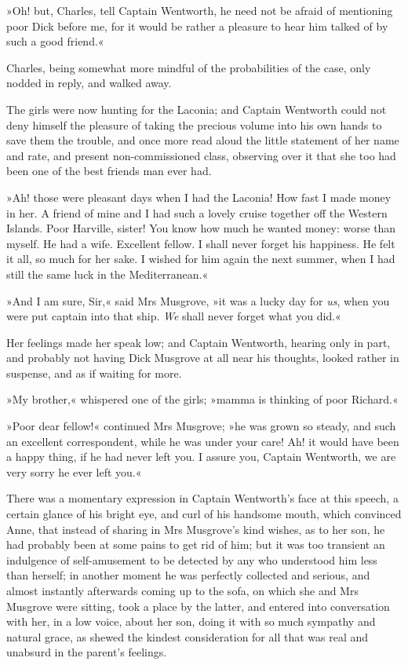 »Oh! but, Charles, tell Captain Wentworth, he need not be afraid of mentioning poor Dick before me, for it would be rather a pleasure to hear him talked of by such a good friend.«

Charles, being somewhat more mindful of the probabilities of the case, only nodded in reply, and walked away.

The girls were now hunting for the Laconia; and Captain Wentworth could not deny himself the pleasure of taking the precious volume into his own hands to save them the trouble, and once more read aloud the little statement of her name and rate, and present non-commissioned class, observing over it that she too had been one of the best friends man ever had.

»Ah! those were pleasant days when I had the Laconia! How fast I made money in her. A friend of mine and I had such a lovely cruise together off the Western Islands. Poor Harville, sister! You know how much he wanted money: worse than myself. He had a wife. Excellent fellow. I shall never forget his happiness. He felt it all, so much for her sake. I wished for him again the next summer, when I had still the same luck in the Mediterranean.«

»And I am sure, Sir,« said Mrs Musgrove, »it was a lucky day for \textit{us}, when you were put captain into that ship. \textit{We} shall never forget what you did.«

Her feelings made her speak low; and Captain Wentworth, hearing only in part, and probably not having Dick Musgrove at all near his thoughts, looked rather in suspense, and as if waiting for more.

»My brother,« whispered one of the girls; »mamma is thinking of poor Richard.«

»Poor dear fellow!« continued Mrs Musgrove; »he was grown so steady, and such an excellent correspondent, while he was under your care! Ah! it would have been a happy thing, if he had never left you. I assure you, Captain Wentworth, we are very sorry he ever left you.«

There was a momentary expression in Captain Wentworth's face at this speech, a certain glance of his bright eye, and curl of his handsome mouth, which convinced Anne, that instead of sharing in Mrs Musgrove's kind wishes, as to her son, he had probably been at some pains to get rid of him; but it was too transient an indulgence of self-amusement to be detected by any who understood him less than herself; in another moment he was perfectly collected and serious, and almost instantly afterwards coming up to the sofa, on which she and Mrs Musgrove were sitting, took a place by the latter, and entered into conversation with her, in a low voice, about her son, doing it with so much sympathy and natural grace, as shewed the kindest consideration for all that was real and unabsurd in the parent's feelings.

